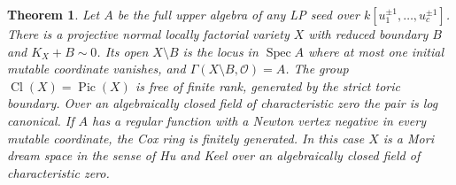 \documentclass[11pt,reqno]{amsart}
\numberwithin{equation}{section}
\newtheorem{theorem}{Theorem}[section]
\theoremstyle{definition}
\theoremstyle{remark}
\DeclareMathOperator{\Spec}{Spec}
\DeclareMathOperator{\Pic}{Pic}
\DeclareMathOperator{\Cl}{Cl}
\begin{document}
\begin{theorem}\label{thm:exchange-cox-model}
Let \(A\) be the full upper algebra of any LP seed over
\(k[u_1^{\pm1},\ldots,u_c^{\pm1}]\). There is a projective normal
locally factorial variety \(X\) with reduced boundary \(B\) and
\(K_X+B\sim0\). Its open \(X\setminus B\) is the locus in \(\Spec A\)
where at most one initial mutable coordinate vanishes, and
\(\Gamma(X\setminus B,\mathcal O)=A\). The group \(\Cl(X)=\Pic(X)\)
is free of finite rank, generated by the strict toric boundary.
Over an algebraically closed field of characteristic zero the pair is
log canonical. If \(A\) has a regular function with a Newton vertex
negative in every mutable coordinate, the Cox ring is finitely
generated. In this case \(X\) is a \emph{Mori dream space} in the
sense of Hu and Keel \cite[Definition~1.10]{HuKeel} over an
algebraically closed field of characteristic zero.
\end{theorem}
\end{document}
